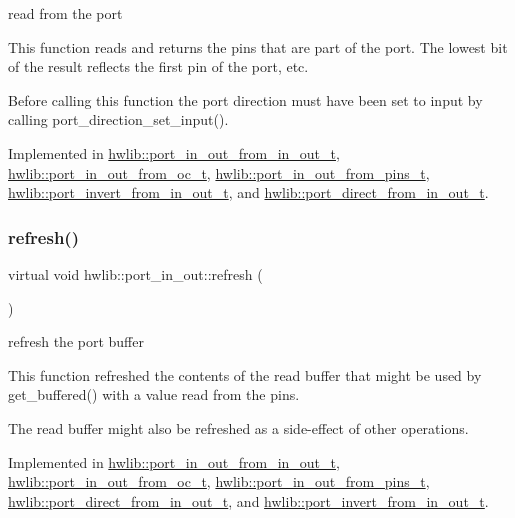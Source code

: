 read from the port

This function reads and returns the pins that are part of the port. The lowest bit of the result reflects the first pin of the port, etc.

Before calling this function the port direction must have been set to input by calling port\+\_\+direction\+\_\+set\+\_\+input(). 

Implemented in \hyperlink{classhwlib_1_1port__in__out__from__in__out__t_a3ee4e60ccde68e997fa48e041dc0e74c}{hwlib\+::port\+\_\+in\+\_\+out\+\_\+from\+\_\+in\+\_\+out\+\_\+t}, \hyperlink{classhwlib_1_1port__in__out__from__oc__t_a9d57f7d3ee2ef22d16d6c47ec914c0fd}{hwlib\+::port\+\_\+in\+\_\+out\+\_\+from\+\_\+oc\+\_\+t}, \hyperlink{classhwlib_1_1port__in__out__from__pins__t_a2e645477ddba8954d3117a62703f170c}{hwlib\+::port\+\_\+in\+\_\+out\+\_\+from\+\_\+pins\+\_\+t}, \hyperlink{classhwlib_1_1port__invert__from__in__out__t_afabad4a7b11e0127b82015b0efbb2e41}{hwlib\+::port\+\_\+invert\+\_\+from\+\_\+in\+\_\+out\+\_\+t}, and \hyperlink{classhwlib_1_1port__direct__from__in__out__t_adfcd5d0e4d4d76a1e92a37fc8e007f0b}{hwlib\+::port\+\_\+direct\+\_\+from\+\_\+in\+\_\+out\+\_\+t}.

\mbox{\label{classhwlib_1_1port__in__out_afa3680e36a05dd3f5a0eac1b63aac37c}} 
\subsubsection{\texorpdfstring{refresh()}{refresh()}}
{\footnotesize\ttfamily virtual void hwlib\+::port\+\_\+in\+\_\+out\+::refresh (\begin{DoxyParamCaption}{ }\end{DoxyParamCaption})\hspace{0.3cm}{\ttfamily [pure virtual]}}

refresh the port buffer

This function refreshed the contents of the read buffer that might be used by get\+\_\+buffered() with a value read from the pins.

The read buffer might also be refreshed as a side-\/effect of other operations. 

Implemented in \hyperlink{classhwlib_1_1port__in__out__from__in__out__t_a35caf2a5266975de6065d2cd801f47f3}{hwlib\+::port\+\_\+in\+\_\+out\+\_\+from\+\_\+in\+\_\+out\+\_\+t}, \hyperlink{classhwlib_1_1port__in__out__from__oc__t_a18b040a25923ba0189c5689e2dedb233}{hwlib\+::port\+\_\+in\+\_\+out\+\_\+from\+\_\+oc\+\_\+t}, \hyperlink{classhwlib_1_1port__in__out__from__pins__t_a0a9b4ffd9faed2aaec708141e699545c}{hwlib\+::port\+\_\+in\+\_\+out\+\_\+from\+\_\+pins\+\_\+t}, \hyperlink{classhwlib_1_1port__direct__from__in__out__t_a4c609a465a6cd1996780001a04ae5bf4}{hwlib\+::port\+\_\+direct\+\_\+from\+\_\+in\+\_\+out\+\_\+t}, and \hyperlink{classhwlib_1_1port__invert__from__in__out__t_ace7b8002a7aa10de1a22634c04751123}{hwlib\+::port\+\_\+invert\+\_\+from\+\_\+in\+\_\+out\+\_\+t}.

